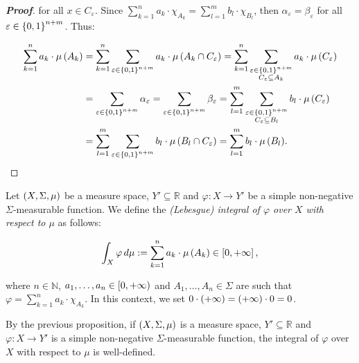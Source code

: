 \begin{proposition}
\begin{proof}[\rm\textbf{Proof}]
    for all $x\in C_{\varepsilon}$. Since $\sum_{k=1}^{n}{a_k\cdot\chi_{A_k}}=\sum_{l=1}^{m}{b_l\cdot\chi_{B_l}}$, then $\alpha_\varepsilon=\beta_\varepsilon$ for all $\varepsilon\in\left\{0,1\right\}^{n+m}$. Thus:

      \allowdisplaybreaks %
      \begin{align}
        \sum_{k=1}^{n}{a_k\cdot\mu\left(A_k\right)} & =\sum_{k=1}^{n}{\sum_{\varepsilon\in\left\{0,1\right\}^{n+m}}{a_k\cdot\mu\left(A_k\cap C_{\varepsilon}\right)}}=\sum_{k=1}^{n}{\sum_{\substack{\varepsilon\in\left\{0,1\right\}^{n+m}\\C_\varepsilon\subseteq A_k}}{a_k\cdot\mu\left(C_{\varepsilon}\right)}}\notag\\
        & =\sum_{\varepsilon\in\left\{0,1\right\}^{n+m}}{\alpha_\varepsilon}=\sum_{\varepsilon\in\left\{0,1\right\}^{n+m}}{\beta_\varepsilon}=\sum_{l=1}^{m}{\sum_{\substack{\varepsilon\in\left\{0,1\right\}^{n+m}\\C_\varepsilon\subseteq B_l}}{b_l\cdot\mu\left(C_{\varepsilon}\right)}}\\
        &=\sum_{l=1}^{m}{\sum_{\varepsilon\in\left\{0,1\right\}^{n+m}}{b_l\cdot\mu\left(B_l\cap C_{\varepsilon}\right)}}=\sum_{l=1}^{m}{b_l\cdot\mu\left(B_l\right)}.\notag
      \end{align}
  \end{proof}
\end{proposition}

\begin{definition}
  Let $\left(X,\Sigma,\mu\right)$ be a measure space, $Y'\subseteq\mathbb{R}$ and $\varphi:X\rightarrow Y'$ be a simple non-negative $\Sigma$-measurable function. We define the \emph{(Lebesgue) integral of $\varphi$ over $X$ with respect to $\mu$} as follows:

  \begin{equation}
    \int_{X}{\varphi\,d\mu}:=\sum_{k=1}^{n}{a_k\cdot\mu\left(A_k\right)}\in\left[0,+\infty\right],
  \end{equation}

  where $n\in\mathbb{N}$, $a_1,\dots,a_n\in\left[0,+\infty\right)$ and $A_1,\dots,A_n\in\Sigma$ are such that $\varphi=\sum_{k=1}^{n}{a_k\cdot\chi_{A_k}}$. In this context, we set $0\cdot\left(+\infty\right)=\left(+\infty\right)\cdot 0=0$.
\end{definition}

\begin{remark}
  By the previous proposition, if $\left(X,\Sigma,\mu\right)$ is a measure space, $Y'\subseteq\mathbb{R}$ and $\varphi:X\rightarrow Y'$ is a simple non-negative $\Sigma$-measurable function, the integral of $\varphi$ over $X$ with respect to $\mu$ is well-defined.
\end{remark}

